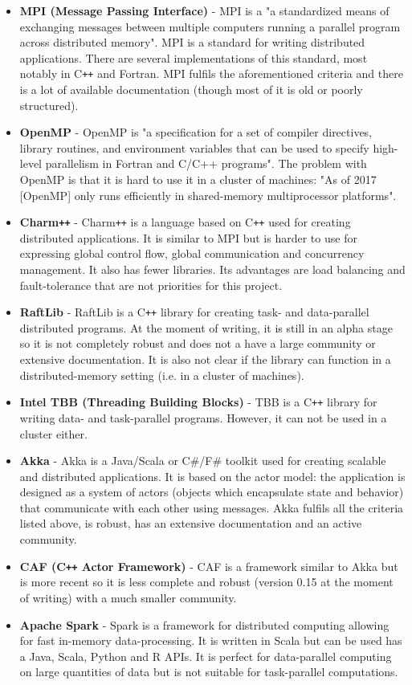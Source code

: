 \documentclass[titlepage]{article}
\begin{document}
\begin{itemize}
\item \textbf{MPI (Message Passing Interface)} - MPI is a "a standardized means of exchanging messages between multiple computers running a parallel program across distributed memory". MPI is a standard for writing distributed applications. There are several implementations of this standard, most notably in C\texttt{++} and Fortran. MPI fulfils the aforementioned criteria and there is a lot of available documentation (though most of it is old or poorly structured).
\item \textbf{OpenMP} - OpenMP is "a specification for a set of compiler directives, library routines, and environment variables that can be used to specify high-level parallelism in Fortran and C/C++ programs". The problem with OpenMP is that it is hard to use it in a cluster of machines: "As of 2017 [OpenMP] only runs efficiently in shared-memory multiprocessor platforms".
\item \textbf{Charm\texttt{++}} - Charm\texttt{++} is a language based on C\texttt{++} used for creating distributed applications. It is similar to MPI but is harder to use for expressing global control flow, global communication and concurrency management. It also has fewer libraries. Its advantages are load balancing and fault-tolerance that are not priorities for this project. 
\item \textbf{RaftLib} - RaftLib is a C\texttt{++} library for creating task- and data-parallel distributed programs. At the moment of writing, it is still in an alpha stage so it is not completely robust and does not a have a large community or extensive documentation. It is also not clear if the library can function in a distributed-memory setting (i.e. in a cluster of machines). 
\item \textbf{Intel TBB (Threading Building Blocks)} - TBB is a C\texttt{++} library for writing data- and task-parallel programs. However, it can not be used in a cluster either.
\item \textbf{Akka} - Akka is a Java/Scala or C\#/F\# toolkit used for creating scalable and distributed applications. It is based on the actor model: the application is designed as a system of actors (objects which encapsulate state and behavior) that communicate with each other using messages. Akka fulfils all the criteria listed above, is robust, has an extensive documentation and an active community.  
\item \textbf{CAF (C\texttt{++} Actor Framework)} - CAF is a framework similar to Akka but is more recent so it is less complete and robust (version 0.15 at the moment of writing) with a much smaller community.
\item \textbf{Apache Spark} - Spark is a framework for distributed computing allowing for fast in-memory data-processing. It is written in Scala but can be used has a Java, Scala, Python and R APIs. It is perfect for data-parallel computing on large quantities of data but is not suitable for task-parallel computations.
\end{itemize}
\end{document}
